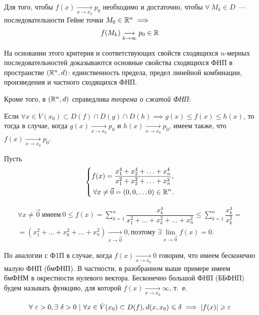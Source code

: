 \documentclass[../../main.tex]{subfiles}
\begin{document}
Для того, чтобы $f(x)\underset{x \to x_0}{\longrightarrow}p_0$
необходимо и достаточно, чтобы
$\forall\ M_k \in D$~--- последовательности Гейне точки 
$M_0 \in \mathbb{R}^n \implies$ 
\[f(M_k)\underset{k \to \infty}
{\longrightarrow}p_0 \in \mathbb{R}\]   

На основании этого критерия и соответствующих свойств сходящихся $n$-мерных
последовательностей доказываются основные свойства сходящихся ФНП
в пространстве $(\mathbb{R}^n, d)$: единственность предела, предел линейной
комбинации, произведения и частного сходящихся ФНП.

Кроме того, в $(\mathbb{R}^n, d)$ справедлива \emph{теорема о сжатой ФНП}:

Если $\forall x \in \dot{V}(x_0) \subset D(f) \cap D(g) \cap D(h) \implies
g(x) \leq f(x) \leq h(x)$, то тогда в случае, когда
$g(x)\underset{x \to x_0}{\longrightarrow}p_0
$ и $h(x)\underset{x \to x_0}{\longrightarrow}p_0$,
имеем также, что $f(x)\underset{x \to x_0}{\longrightarrow}p_0$.

\begin{exmp}

Пусть \[ \left\{\begin{aligned}
	f(x) = \dfrac{x_1^4 + x_2^4 + \ldots + x_n^4}{x_1^2 + x_2^2 +
		\ldots + x_n^2}, \\
	\forall x \ne \vec{0} = (0, 0, \ldots 0) \in \mathbb{R}^n.
\end{aligned}\right. \]

\begin{gather*}
	\forall x \ne \vec{0}\ \text{имеем}\ 0 \leq f(x) =
	\displaystyle\sum_{k=1}^{n}{\dfrac{x_k^4}{x_1^2 + \dots + x_k^2 +
			\ldots + x_n^2}} \le
	\displaystyle\sum_{k=1}^{n}{\dfrac{x_k^4}{x_k^2}} = \\ =
	(x_1^2 + \ldots + x_k^2 + \ldots + x_n^2)
	\underset{x \to \vec{0}}{\longrightarrow}0, \text{поэтому }
	\exists\displaystyle\lim_{x \to \vec{0}}f(x) = 0.
\end{gather*}

\end{exmp}

По аналогии с Ф1П в случае, когда $f(x)\underset{x \to x_0}{\longrightarrow}0$
говорим, что имеем бесконечно малую ФНП (бмФНП). В частности,
в разобранном выше примере имеем бмФНМ в окрестности нулевого вектора.
Бесконечно большой ФНП (ББФНП) будем называть функцию,
для которой $f(x)\underset{x \to x_0}{\longrightarrow}\infty$, т.~е.

\[\forall\ \varepsilon > 0, \exists\ \delta > 0\ |\
\forall x \in \dot{V}(x_0) \subset D(f), d(x, x_0) \leqslant \delta
\implies |f(x)| \geqslant \varepsilon\]
\end{document}
